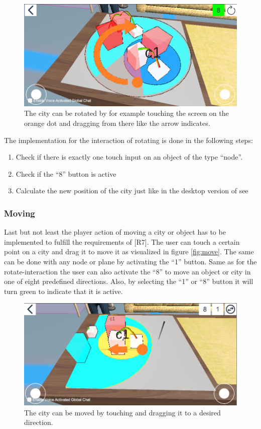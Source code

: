 \begin{figure}[htb]
    \centering
    \includegraphics[width=1\textwidth]{Implementation/img/rotate.png}
    \caption{The \gls{city} can be rotated by for example touching the screen on the orange dot and dragging from there like the arrow indicates.}\label{fig:rotate}
\end{figure}

The implementation for the interaction of rotating is done in the following steps:
\begin{enumerate}
    \item Check if there is exactly one touch input on an object of the type \enquote{\gls{node}}.
    \item Check if the \enquote{8} button is active
    \item Calculate the new position of the \gls{city} just like in the desktop version of \gls{see}
\end{enumerate}
\subsubsection{Moving}
Last but not least the player action of moving a \gls{city} or object has to be implemented to fulfill the requirements of [R7].
The user can touch a certain point on a \gls{city} and drag it to move it as visualized in figure \ref{fig:move}.
The same can be done with any \gls{node} or \gls{plane} by activating the \enquote{1} button.
Same as for the rotate-interaction the user can also activate the \enquote{8} to move an object or city in one of eight predefined directions.
Also, by selecting the \enquote{1} or \enquote{8} button it will turn green to indicate that it is active.

\begin{figure}[htb]
    \centering
    \includegraphics[width=1\textwidth]{Implementation/img/move.png}
    \caption{The \gls{city} can be moved by touching and dragging it to a desired direction.}\label{fig:left}
\end{figure}

